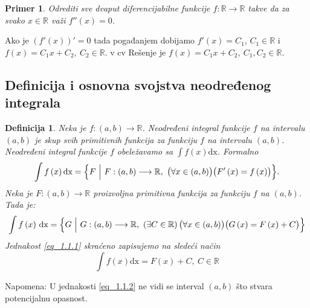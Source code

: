 \documentclass{article}
\newtheorem{definicija}{Definicija}[section]
\newtheorem{prim}{Primer}[section]
\begin{document}
\begin{primbox}
    \label{primer_1.2}
    \begin{prim}
        Odrediti sve dvaput diferencijabilne funkcije
        $f: \mathbb{R} \longrightarrow \mathbb{R}$ takve da
        za svako $x \in \mathbb{R}$ važi $f''\left(x\right) = 0$.\par
    \end{prim}
    Ako je $\left(f'\left(x\right)\right)' = 0$ tada pogađanjem dobijamo $f'\left(x\right) = C_1$, $C_1 \in \mathbb{R}$
    i     $f\left(x\right) = C_1x+C_2,\ C_2 \in \mathbb{R}$. v  cv
    Rešenje je $f\left(x\right) = C_1x + C_2,\ C_1, C_2 \in \mathbb{R}$.
\end{primbox}

\subsection{Definicija i osnovna svojstva neodređenog integrala}
\begin{defbox}
    \label{definicija_1.2}
    \begin{definicija}
        Neka je $f: \left(a, b\right) \longrightarrow \mathbb{R}$.
        Neodređeni integral funkcije $f$ na intervalu $\left(a, b\right)$ je
        skup svih primitivnih funkcija za funkciju $f$ na intervalu
        $\left(a, b\right)$. Neodređeni integral funkcije $f$ obeležavamo sa
        $\displaystyle\int f\left(x\right)\text{dx}$. Formalno
        $$\int f\left(x\right) \text{dx} = \Bigl\{F\ \Big|\ F: \left(a, b\right) \longrightarrow \mathbb{R},\
            \bigl(\forall x\in\left(a,b\right)\bigr)\bigl(F'\left(x\right) = f\left(x\right)\bigr)\Bigr\}.$$
        Neka je $F: \left(a,b\right) \longrightarrow \mathbb{R}$ proizvoljna
        primitivna funkcija za funkciju $f$ na $\left(a,b\right)$. Tada je:
        \setcounter{equation}{0}
        \begin{equation} \label{eq_1.1.1}
            \int f\left(x\right) \, \text{dx} =\Bigl\{G\ \Big|\ G: \left(a, b\right) \longrightarrow \mathbb{R},\ \left(\exists C \in \mathbb{R}\right) \bigl(\forall x \in \left(a, b\right)\bigr)\bigl(G\left(x\right) = F\left(x\right) + C\bigr)\Bigr\}
        \end{equation}
        Jednakost \eqref{eq_1.1.1} skraćeno zapisujemo na sledeći način
        \begin{equation}\label{eq_1.1.2}
            \int f\left(x\right)\text{dx} = F\left(x\right) + C,\ C\in\mathbb{R}
        \end{equation}
    \end{definicija}
    Napomena: U jednakosti \eqref{eq_1.1.2} ne vidi se interval $\left(a, b\right)$ što
    stvara potencijalnu opasnost.
\end{defbox}
\end{document}
